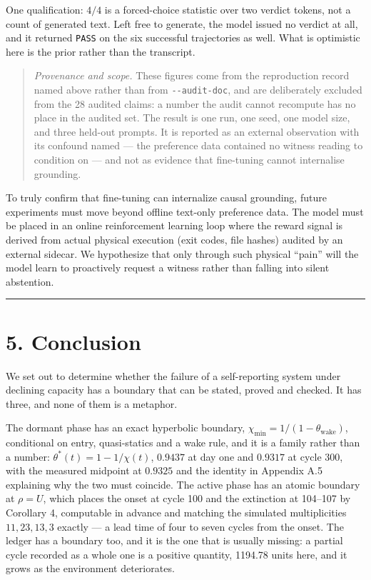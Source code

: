 \documentclass[11pt,a4paper]{article}
\newcounter{none}
\begin{document}
One qualification: \(4/4\) is a forced-choice statistic over two verdict tokens,
not a count of generated text. Left free to generate, the model issued no verdict
at all, and it returned \texttt{PASS} on the six successful trajectories as well. What is
optimistic here is the prior rather than the transcript.

\begin{quote}
\emph{Provenance and scope.} These figures come from the reproduction record named
above rather than from \texttt{-\/-audit-doc}, and are deliberately excluded from the 28
audited claims: a number the audit cannot recompute has no place in the
audited set. The result is one run, one seed, one model size, and three
held-out prompts. It is reported as an external observation with its confound
named --- the preference data contained no witness reading to condition on --- and
not as evidence that fine-tuning cannot internalise grounding.
\end{quote}

To truly confirm that fine-tuning can internalize causal grounding, future
experiments must move beyond offline text-only preference data. The model must
be placed in an online reinforcement learning loop where the reward signal is
derived from actual physical execution (exit codes, file hashes) audited by an
external sidecar. We hypothesize that only through such physical ``pain'' will the
model learn to proactively request a witness rather than falling into silent
abstention.

\begin{center}\rule{0.5\linewidth}{0.5pt}\end{center}

\section{5. Conclusion}\label{conclusion}

We set out to determine whether the failure of a self-reporting system under
declining capacity has a boundary that can be stated, proved and checked. It has
three, and none of them is a metaphor.

The dormant phase has an exact hyperbolic boundary,
\(\chi_{\min}=1/(1-\theta_{\mathrm{wake}})\), conditional on entry, quasi-statics and
a wake rule, and it is a family rather than a number:
\(\theta^\ast(t)=1-1/\chi(t)\), \(0.9437\) at day one and \(0.9317\) at cycle 300, with
the measured midpoint at \(0.9325\) and the identity in Appendix A.5 explaining why
the two must coincide. The active phase has an atomic boundary at
\(\rho=U\), which places the onset at cycle 100 and the extinction at 104--107 by
Corollary 4, computable in advance and matching the simulated multiplicities
\(11,23,13,3\) exactly --- a lead time of four to seven cycles from the onset. The ledger has a boundary too, and it is the one that is
usually missing: a partial cycle recorded as a whole one is a positive quantity,
1194.78 units here, and it grows as the environment deteriorates.
\end{document}
